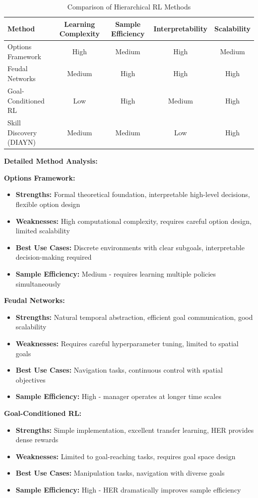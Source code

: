 \documentclass[12pt]{article}
\begin{document}
{{\begin{table}[h]
\centering
\caption{Comparison of Hierarchical RL Methods}
\label{tab:comparison}
\begin{tabular}{|l|c|c|c|c|}
\hline
\textbf{Method} & \textbf{Learning Complexity} & \textbf{Sample Efficiency} & \textbf{Interpretability} & \textbf{Scalability} \\
\hline
Options Framework & High & Medium & High & Medium \\
Feudal Networks & Medium & High & High & High \\
Goal-Conditioned RL & Low & High & Medium & High \\
Skill Discovery (DIAYN) & Medium & Medium & Low & High \\
\hline
\end{tabular}
\end{table}

\textbf{Detailed Method Analysis:}

\textbf{Options Framework:}
\begin{itemize}
    \item \textbf{Strengths:} Formal theoretical foundation, interpretable high-level decisions, flexible option design
    \item \textbf{Weaknesses:} High computational complexity, requires careful option design, limited scalability
    \item \textbf{Best Use Cases:} Discrete environments with clear subgoals, interpretable decision-making required
    \item \textbf{Sample Efficiency:} Medium - requires learning multiple policies simultaneously
\end{itemize}

\textbf{Feudal Networks:}
\begin{itemize}
    \item \textbf{Strengths:} Natural temporal abstraction, efficient goal communication, good scalability
    \item \textbf{Weaknesses:} Requires careful hyperparameter tuning, limited to spatial goals
    \item \textbf{Best Use Cases:} Navigation tasks, continuous control with spatial objectives
    \item \textbf{Sample Efficiency:} High - manager operates at longer time scales
\end{itemize}

\textbf{Goal-Conditioned RL:}
\begin{itemize}
    \item \textbf{Strengths:} Simple implementation, excellent transfer learning, HER provides dense rewards
    \item \textbf{Weaknesses:} Limited to goal-reaching tasks, requires goal space design
    \item \textbf{Best Use Cases:} Manipulation tasks, navigation with diverse goals
    \item \textbf{Sample Efficiency:} High - HER dramatically improves sample efficiency
\end{itemize}

}}
\end{document}

